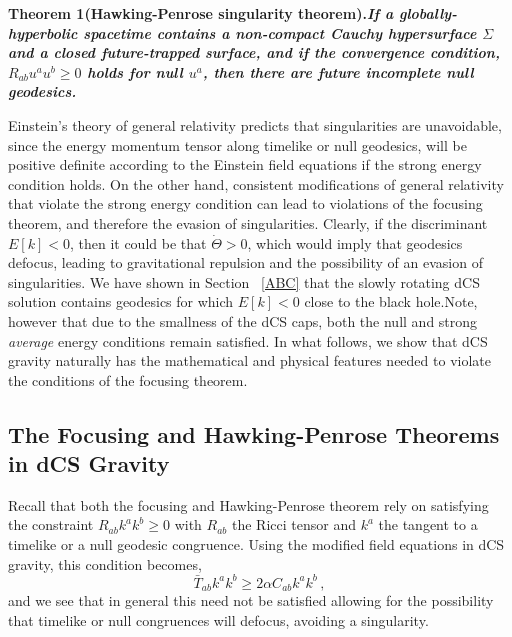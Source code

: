 \documentclass[prd,twocolumn,showpacs,superscriptaddress,nofootinbib]{revtex4-2}
\newcommand\be{\begin{equation}}
\newcommand\ee{\end{equation}}
\begin{document}
\bf{Theorem 1}\rm(Hawking-Penrose singularity theorem).\it{If a globally-hyperbolic spacetime contains a non-compact
Cauchy hypersurface $\Sigma$ and a closed future-trapped surface, and if the convergence condition, $R_{ab}u^{a}u^{b} \geq 0$  holds for null $u^{a}$, then there are future incomplete null geodesics.}\rm

Einstein's theory of general relativity predicts that singularities are unavoidable, since the energy momentum tensor along timelike or null geodesics, will be positive definite according to the Einstein field equations if the strong energy condition holds. On the other hand, consistent modifications of general relativity that violate the strong energy condition can lead to violations of the focusing theorem, and therefore the evasion of singularities. Clearly, if the discriminant $E[k] < 0$, then it could be that $\dot{\Theta} >0$, which would imply that geodesics defocus, leading to gravitational repulsion and the possibility of an evasion of singularities. We have shown in Section ~\ref{ABC} that the slowly rotating dCS solution contains geodesics for which $E[k] <0$ close to the black hole.Note, however that due to the smallness of the dCS caps, both the null and strong \textit{average} energy conditions \cite{Borde_1987} remain satisfied. In what follows, we show that dCS gravity naturally has the mathematical and physical features needed to violate the conditions of the focusing theorem. 

\subsection{The Focusing  and Hawking-Penrose Theorems in dCS Gravity}

Recall that both the focusing and Hawking-Penrose theorem rely on satisfying the constraint $R_{ab}k^{a}k^{b} \geq 0$ with $R_{ab}$ the Ricci tensor and $k^a$ the tangent to a timelike or a null geodesic congruence. Using the modified field equations in dCS gravity, this condition becomes,
%
\be 
\bar{T}_{ab} k^{a}k^{b} \geq 2 \alpha C_{ab} k^{a}k^{b}\,, 
\ee 
and we see that in general this need not be satisfied allowing for the possibility that timelike or null congruences will defocus, avoiding a singularity.  
\end{document}
